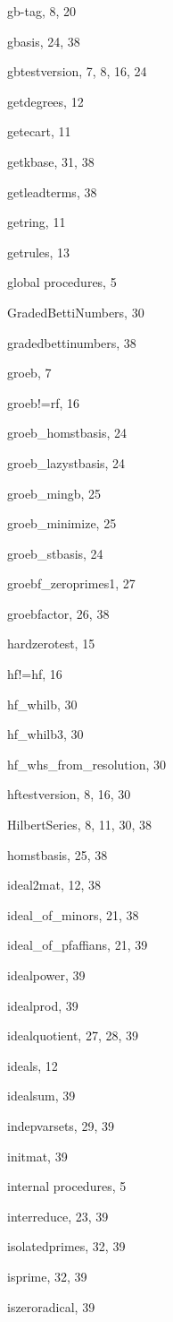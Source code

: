 \documentclass[a4paper,11pt]{article}
\begin{document}
\begin{theindex}
  \item gb-tag, 8, 20
  \item gbasis, 24, 38
  \item gbtestversion, 7, 8, 16, 24
  \item getdegrees, 12
  \item getecart, 11
  \item getkbase, 31, 38
  \item getleadterms, 38
  \item getring, 11
  \item getrules, 13
  \item global procedures, 5
  \item GradedBettiNumbers, 30
  \item gradedbettinumbers, 38
  \item groeb, 7
  \item groeb!=rf, 16
  \item groeb\_homstbasis, 24
  \item groeb\_lazystbasis, 24
  \item groeb\_mingb, 25
  \item groeb\_minimize, 25
  \item groeb\_stbasis, 24
  \item groebf\_zeroprimes1, 27
  \item groebfactor, 26, 38

  \indexspace

  \item hardzerotest, 15
  \item hf!=hf, 16
  \item hf\_whilb, 30
  \item hf\_whilb3, 30
  \item hf\_whs\_from\_resolution, 30
  \item hftestversion, 8, 16, 30
  \item HilbertSeries, 8, 11, 30, 38
  \item homstbasis, 25, 38

  \indexspace

  \item ideal2mat, 12, 38
  \item ideal\_of\_minors, 21, 38
  \item ideal\_of\_pfaffians, 21, 39
  \item idealpower, 39
  \item idealprod, 39
  \item idealquotient, 27, 28, 39
  \item ideals, 12
  \item idealsum, 39
  \item indepvarsets, 29, 39
  \item initmat, 39
  \item internal procedures, 5
  \item interreduce, 23, 39
  \item isolatedprimes, 32, 39
  \item isprime, 32, 39
  \item iszeroradical, 39


\end{theindex}
\end{document}
